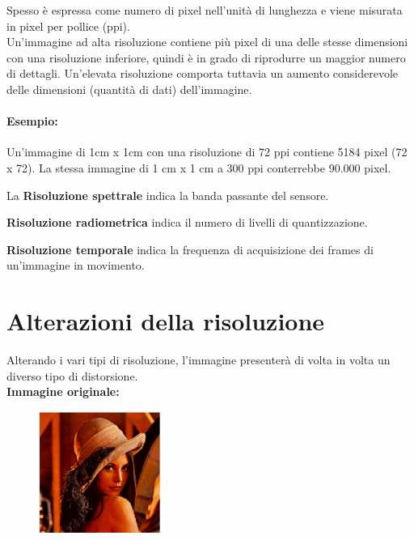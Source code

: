 Spesso è espressa come numero di pixel
nell'unità di lunghezza e viene misurata in pixel per pollice (ppi).
\\Un'immagine ad alta risoluzione contiene più pixel di una delle
stesse dimensioni con una risoluzione inferiore, quindi è in grado di
riprodurre un maggior numero di dettagli. Un'elevata risoluzione
comporta tuttavia un aumento considerevole delle dimensioni (quantità
di dati) dell'immagine.

\paragraph{Esempio:}

Un'immagine di 1cm x 1cm con una risoluzione di 72 ppi
contiene 5184 pixel (72 x 72). La stessa immagine di 1 cm x
1 cm a 300 ppi conterrebbe 90.000 pixel.

\begin{definition}
    La \textbf{Risoluzione spettrale} indica la banda passante del sensore.

\end{definition}


\begin{definition}
    \textbf{Risoluzione radiometrica} indica il numero di livelli di quantizzazione.

\end{definition}


\begin{definition}
    \textbf{Risoluzione temporale} indica la frequenza di acquisizione dei frames di un'immagine in
    movimento.
\end{definition}



\section{Alterazioni della risoluzione}
Alterando i vari tipi di risoluzione, l'immagine presenterà di volta in volta un
diverso tipo di distorsione. \\ \textbf{Immagine originale:}

\begin{figure}[H]
    \centering
    \includegraphics[width=4cm, keepaspectratio]{capitoli/immagini/imgs/alterazione_risoluzioni_esempio_base.jpg}
\end{figure}

